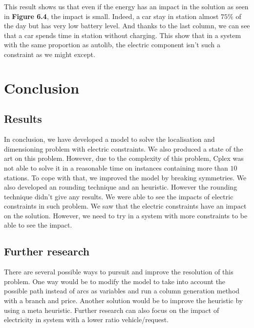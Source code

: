 \begin{bibunit}[ieeetr]
This result shows us that even if the energy has an impact in the solution as seen in \textbf{Figure 6.4}, the impact is small.
Indeed, a car stay in station almost $75\%$ of the day but has very low battery level.
And thanks to the last column, we can see that a car spends time in station without charging.
This show that in a system with the same proportion as autolib, the electric component isn't such a constraint as we might except. 
\newpage

\section{Conclusion}
\subsection{Results}
In conclusion, we have developed a model to solve the localisation and dimensioning problem with electric constraints. We also produced a state of the art on this problem. However, due to the complexity of this problem, Cplex was not able to solve it in a reasonable time on instances containing more than $10$ stations. To cope with that, we improved the model by breaking symmetries. We also developed an rounding technique and an heuristic. However the rounding technique didn't give any results.
We were able to see the impacts of electric constraints in such problem. We saw that the electric constraints have an impact on the solution. However, we need to try in a system with more constraints to be able to see the impact.
\subsection{Further research}
There are several possible ways to pursuit and improve the resolution of this problem. One way would be to modify the model to take into account the possible path instead of arcs as variables and run a column generation method with a branch and price. Another solution would be to improve the heuristic by using a meta heuristic. Further research can also focus on the impact of electricity in system with a lower ratio vehicle/request.

\newpage
{}
\renewcommand{\bibname}{Bibliography of chapter \thechapter}
\end{bibunit}
